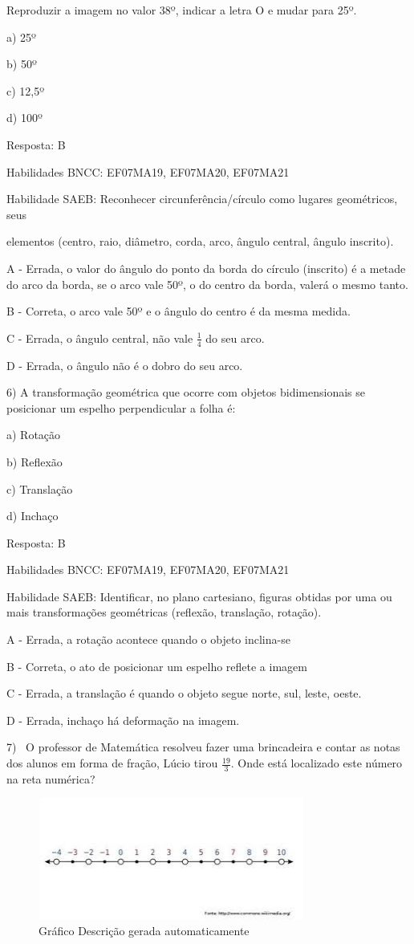 Reproduzir a imagem no valor 38º, indicar a letra O e mudar para 25º.

a) 25º

b) 50º

c) 12,5º

d) 100º

Resposta: B

Habilidades BNCC: EF07MA19, EF07MA20, EF07MA21

Habilidade SAEB: Reconhecer circunferência/círculo como lugares
geométricos, seus

elementos (centro, raio, diâmetro, corda, arco, ângulo central, ângulo
inscrito).

A - Errada, o valor do ângulo do ponto da borda do círculo (inscrito) é
a metade do arco da borda, se o arco vale 50º, o do centro da borda,
valerá o mesmo tanto.

B - Correta, o arco vale 50º e o ângulo do centro é da mesma medida.

C - Errada, o ângulo central, não vale \(\frac{1}{4}\) do seu arco.

D - Errada, o ângulo não é o dobro do seu arco.

6) A transformação geométrica que ocorre com objetos bidimensionais se
posicionar um espelho perpendicular a folha é:

a) Rotação

b) Reflexão

c) Translação

d) Inchaço~

Resposta: B

Habilidades BNCC: EF07MA19, EF07MA20, EF07MA21

Habilidade SAEB: Identificar, no plano cartesiano, figuras obtidas por
uma ou~ mais transformações geométricas (reflexão, translação, rotação).

A - Errada, a rotação acontece quando o objeto inclina-se

B - Correta, o ato de posicionar um espelho reflete a imagem

C - Errada, a translação é quando o objeto segue norte, sul, leste,
oeste.

D - Errada, inchaço há deformação na imagem.

7)~ O professor de Matemática resolveu fazer uma brincadeira e contar as
notas dos alunos em forma de fração, Lúcio tirou \(\frac{19}{3}\). Onde
está localizado este número na reta numérica?

\begin{figure}
\centering
\includegraphics[width=3.44375in,height=1.57361in]{./imgSAEB_7_MAT/media/image109.png}
\caption{Gráfico Descrição gerada automaticamente}
\end{figure}

